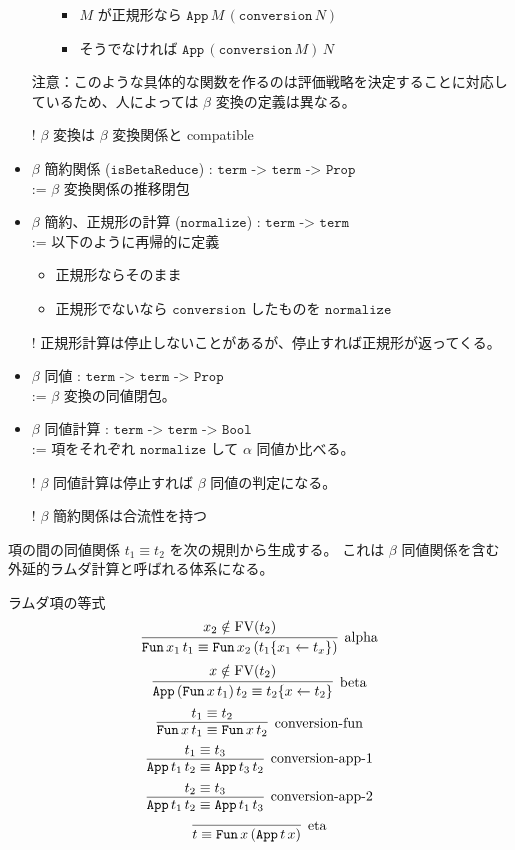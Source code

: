 \documentclass[dvipdfmx]{jsarticle}
\begin{document}
\begin{itemize}
\begin{itemize}
        \begin{itemize}
          \item \(M\) が正規形なら \(\texttt{App} \, M \, (\texttt{conversion} \, N)\)
          \item そうでなければ \(\texttt{App} \, (\texttt{conversion} \, M) \, N\)
        \end{itemize}
    \end{itemize}
  注意：このような具体的な関数を作るのは評価戦略を決定することに対応しているため、人によっては \(\beta\) 変換の定義は異なる。
\item[!] \(\beta\) 変換は \(\beta\) 変換関係と compatible 
  \item \(\beta\) 簡約関係 (\(\texttt{isBetaReduce}\)) : \(\texttt{term -> term -> Prop}\) \\
    := \(\beta\) 変換関係の推移閉包
  \item \(\beta\) 簡約、正規形の計算 (\(\texttt{normalize}\)) : \(\texttt{term -> term}\) \\
    := 以下のように再帰的に定義
      \begin{itemize}
        \item 正規形ならそのまま
        \item 正規形でないなら \(\texttt{conversion}\) したものを \(\texttt{normalize}\)
      \end{itemize}
  \item[!] 正規形計算は停止しないことがあるが、停止すれば正規形が返ってくる。
  \item \(\beta\) 同値 : \(\texttt{term -> term -> Prop}\) \\
    := \(\beta\) 変換の同値閉包。
  \item \(\beta\) 同値計算 : \(\texttt{term -> term -> Bool}\) \\
    := 項をそれぞれ \(\texttt{normalize}\) して \(\alpha\) 同値か比べる。
  \item[!] \(\beta\) 同値計算は停止すれば \(\beta\) 同値の判定になる。
  \item[!] \(\beta\) 簡約関係は合流性を持つ
\end{itemize}

項の間の同値関係 \(t_1 \equiv t_2\) を次の規則から生成する。
これは \(\beta\) 同値関係を含む外延的ラムダ計算と呼ばれる体系になる。

\begin{itembox}[l]{ラムダ項の等式}
  \[\infer[\text{alpha}]{\texttt{Fun} \, x_1 \, t_1 \equiv \texttt{Fun} \, x_2 \, (t_1\{x_1 \leftarrow t_x\})}{x_2 \notin \text{FV}(t_2)}\]
  \[\infer[\text{beta}]{\texttt{App} \, (\texttt{Fun} \, x \, t_1) \, t_2 \equiv t_2\{x \leftarrow t_2\}}{x \notin \text{FV}(t_2)}\]
  \[\infer[\text{conversion-fun}]{\texttt{Fun} \, x \, t_1 \equiv \texttt{Fun} \, x \, t_2}{t_1 \equiv t_2}\]
  \[\infer[\text{conversion-app-1}]{\texttt{App} \, t_1 \, t_2 \equiv \texttt{App} \, t_3 \, t_2}{t_1 \equiv t_3}\]
  \[\infer[\text{conversion-app-2}]{\texttt{App} \, t_1 \, t_2 \equiv \texttt{App} \, t_1 \, t_3}{t_2 \equiv t_3}\]
  \[\infer[\text{eta}]{t \equiv \texttt{Fun} \, x \, (\texttt{App} \, t \, x)}{}\]
\end{itembox}
\end{document}
